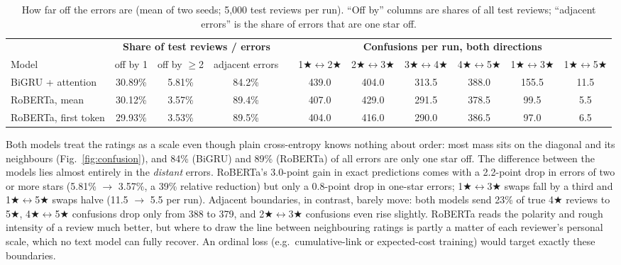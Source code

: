 \documentclass[10pt,a4paper]{article}
\newcommand{\st}[1]{#1$\bigstar$}
\begin{document}
\begin{table}[!htbp]
\centering\footnotesize
\setlength{\tabcolsep}{3.6pt}
\begin{adjustbox}{max width=\textwidth}
\begin{tabular}{@{}lcccccccccc@{}}
\toprule
 & \multicolumn{3}{c}{\textbf{Share of test reviews / errors}} & & \multicolumn{6}{c}{\textbf{Confusions per run, both directions}} \\
\cmidrule{2-4}\cmidrule{6-11}
Model & off by 1 & off by $\geq$2 & adjacent errors & & \st{1}$\leftrightarrow$\st{2} & \st{2}$\leftrightarrow$\st{3} & \st{3}$\leftrightarrow$\st{4} & \st{4}$\leftrightarrow$\st{5} & \st{1}$\leftrightarrow$\st{3} & \st{1}$\leftrightarrow$\st{5} \\
\midrule
BiGRU + attention    & 30.89\% & 5.81\% & 84.2\% & & 439.0 & 404.0 & 313.5 & 388.0 & 155.5 & 11.5 \\
RoBERTa, mean        & 30.12\% & 3.57\% & 89.4\% & & 407.0 & 429.0 & 291.5 & 378.5 &  99.5 &  5.5 \\
RoBERTa, first token & 29.93\% & 3.53\% & 89.5\% & & 404.0 & 416.0 & 290.0 & 386.5 &  97.0 &  6.5 \\
\bottomrule
\end{tabular}
\end{adjustbox}
\caption{How far off the errors are (mean of two seeds; 5{,}000 test reviews per run). ``Off by'' columns are
shares of all test reviews; ``adjacent errors'' is the share of errors that are one star off.}
\label{tab:ordinal}
\end{table}

Both models treat the ratings as a scale even though plain cross-entropy knows nothing about order: most mass sits
on the diagonal and its neighbours (Fig.~\ref{fig:confusion}), and 84\% (BiGRU) and 89\% (RoBERTa) of all errors are
only one star off. The difference between the models lies almost entirely in the \emph{distant} errors.
RoBERTa's 3.0-point gain in exact predictions comes with a 2.2-point drop in errors of two or more stars (5.81\%
$\to$ 3.57\%, a 39\% relative reduction) but only a 0.8-point drop in one-star errors; \st{1}$\leftrightarrow$\st{3}
swaps fall by a third and \st{1}$\leftrightarrow$\st{5} swaps halve (11.5 $\to$ 5.5 per run). Adjacent boundaries, in
contrast, barely move: both models send 23\% of true \st{4} reviews to \st{5}, \st{4}$\leftrightarrow$\st{5}
confusions drop only from 388 to 379, and \st{2}$\leftrightarrow$\st{3} confusions even rise slightly. RoBERTa reads
the polarity and rough intensity of a review much better, but where to draw the line between neighbouring ratings is
partly a matter of each reviewer's personal scale, which no text model can fully recover. An ordinal loss (e.g.\
cumulative-link or expected-cost training) would target exactly these boundaries.
\end{document}
